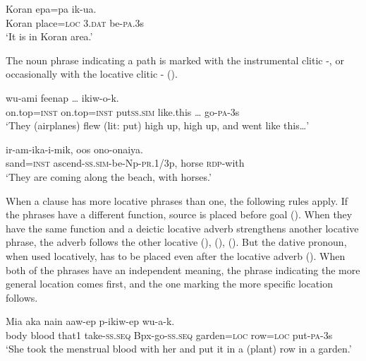 \ea%
\label{ex:x1801}
\gll Koran  epa=pa    ik-ua. \\
    Koran  place=\textsc{loc}  3.\textsc{dat}  be-\textsc{pa}.3s  \\
\glt`It is in Koran area.'
\z





The noun phrase indicating a path is marked with the instrumental clitic -, or occasionally with the locative clitic - ().

\ea%
\label{ex:x866}
\gll {}   wu-ami  feenap  {\dots}  ikiw-o-k. \\
  on.top=\textsc{inst}  on.top=\textsc{inst}  put\textsc{ss}.\textsc{sim}  like.this  {\dots}  go-\textsc{pa}-3s    \\
\glt`They (airplanes) flew (lit: put) high up, high up, and went like this{\dots}'
\z





\ea%
\label{ex:x867}
\gll {}  ir-am-ika-i-mik,  oos  ono-onaiya. \\
   sand=\textsc{inst}  ascend-\textsc{ss}.\textsc{sim}-be-Np-\textsc{pr}.1/3p,  horse  \textsc{rdp}-with   \\
\glt`They are coming along the beach, with horses.'
\z





When a clause has more locative phrases than one, the following rules apply. If  the phrases have a different function, source is placed before goal (). When they have the same function and a deictic locative adverb strengthens another locative phrase, the adverb follows the other locative (), (), (). But  the dative pronoun, when used locatively, has to be placed even after the locative adverb (). When both of the phrases have an independent meaning, the phrase indicating the more general location comes first, and the one marking the more specific location follows.

\ea%
\label{ex:x868}
\gll Mia  aka  nain  aaw-ep  p-ikiw-ep     wu-a-k.\\
   body  blood  that1  take-\textsc{ss}.\textsc{seq}  Bpx-go-\textsc{ss}.\textsc{seq}  garden=\textsc{loc}    row=\textsc{loc}  put-\textsc{pa}-3s  \\
\glt`She took the menstrual blood with her and put it in a (plant) row in a garden.'
\z









